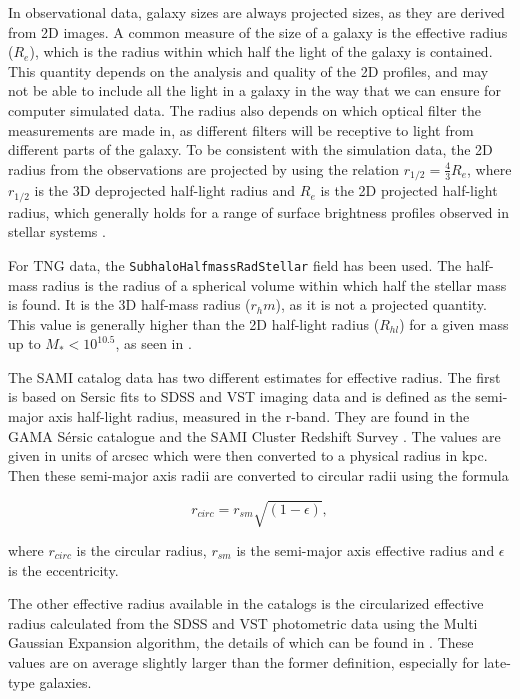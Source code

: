 In observational data, galaxy sizes are always projected sizes, as they are derived from 2D images. A common measure of the size of a galaxy is the effective radius ($R_e$), which is the radius within which half the light of the galaxy is contained. This quantity depends on the analysis and quality of the 2D profiles, and may not be able to include all the light in a galaxy in the way that we can ensure for computer simulated data. The radius also depends on which optical filter the measurements are made in, as different filters will be receptive to light from different parts of the galaxy. To be consistent with the simulation data, the 2D radius from the observations are projected by using the relation $r_{1/2} = \frac{4}{3}R_{e}$, where $r_{1/2}$ is the 3D deprojected half-light radius and $R_e$ is the 2D projected half-light radius, which generally holds for a range of surface brightness profiles observed in stellar systems \parencite{Wolf2010}.

For TNG data, the \texttt{SubhaloHalfmassRadStellar} field has been used. The half-mass radius is the radius of a spherical volume within which half the stellar mass is found. It is the 3D half-mass radius ($r_hm$), as it is not a projected quantity. This value is generally higher than the 2D half-light radius ($R_{hl}$) for a given mass up to $M_{*} < 10^{10.5}$, as seen in \textcite{Genel2017}. 

The SAMI catalog data has two different estimates for effective radius. The first is based on Sersic fits to SDSS and VST imaging data and is defined as the semi-major axis half-light radius, measured in the r-band. They are found in the GAMA Sérsic catalogue \parencite{Driver2011} and the SAMI Cluster Redshift Survey \parencite{Owers2017}. The values are given in units of arcsec which were then converted to a physical radius in kpc. Then these semi-major axis radii are converted to circular radii using the formula

\begin{equation}
   r_{circ} = r_{sm}\sqrt{(1-\epsilon)},
\end{equation}

where $r_{circ}$ is the circular radius, $r_{sm}$ is the semi-major axis effective radius and $\epsilon$ is the eccentricity.

The other effective radius available in the catalogs is the circularized effective radius calculated from the SDSS and VST photometric data using the Multi Gaussian Expansion algorithm, the details of which can be found in \textcite{Scott2021}. These values are on average slightly larger than the former definition, especially for late-type galaxies.



